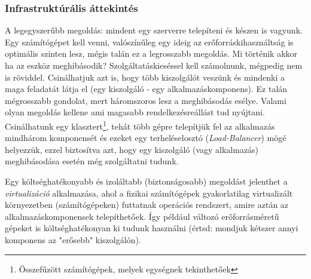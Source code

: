 \subsubsection{Infrastruktúrális áttekintés}
A legegyszerűbb megoldás: mindent egy szerverre telepíteni és készen is vagyunk. Egy számítógépet kell venni, valószínűleg egy ideig az erőforráskihasználtság is optimális szinten lesz, mégis talán ez a legrosszabb megoldás. Mi történik akkor ha az eszköz meghibásodik? Szolgáltatáskieséssel kell számolnunk, mégpedig nem is röviddel. Csinálhatjuk azt is, hogy több kiszolgálót veszünk és mindenki a maga feladatát látja el (egy kiszolgáló - egy alkalmazáskomponens). Ez talán mégrosszabb gondolat, mert háromszoros lesz a meghibásodás esélye. Valami olyan megoldás kellene ami magasabb rendelkezésreállást tud nyújtani. Csinálhatunk egy klasztert\footnote{Összefűzött számítógépek, melyek egységnek tekinthetőek}, tehát több gépre telepítjük fel az alkalmazás mindhárom komponensét és ezeket egy terheléselosztó (\textit{Load-Balancer}) mögé helyezzük, ezzel biztosítva azt, hogy egy kiszolgáló (vagy alkalmazás) meghibásodása esetén még szolgáltatni tudunk.

Egy költséghatékonyabb és izoláltabb (biztonságosabb) megoldást jelenthet a \textit{virtualizáció} alkalmazása, ahol a fizikai számítógépek gyakorlatilag virtualizált környezetben (számítógépeken) futtatnak operációs rendszert, amire aztán az alkalmazáskomponensek telepíthetőek. Így például változó erőforrásméretű gépeket is költséghatékonyan ki tudunk használni (értsd: mondjuk kétszer annyi komponens az "erősebb" kiszolgálón).